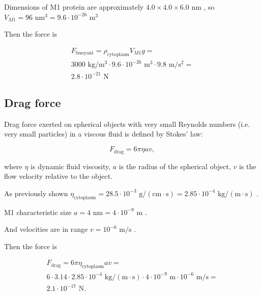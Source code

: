 Dimensions of M1 protein are approximately $4.0 \times 4.0 \times 6.0 \text{ nm}$ \cite{shtykova2013structural}, so $V_{M1} = 96 \text{ nm}^3 = 9.6 \cdot 10^{-26} \text{ m}^3$

Then the force is

\begin{equation}
\begin{split}
F_{\text{buoyant}} = \rho_{\text{cytoplasm}}V_{M1}g =\\
3000 \text{ kg}/\text{m}^3 \cdot 9.6 \cdot 10^{-26} \text{ m}^3 \cdot 9.8 \text{ m}/\text{s}^2 =\\
2.8 \cdot 10^{-21} \text{ N}
\end{split}
\end{equation}

\subsection{Drag force}

Drag force exerted on spherical objects with very small Reynolds numbers (i.e. very small particles) in a viscous fluid is defined by Stokes' law:

\begin{equation}
F_{\text{drag}} = 6\pi\eta av,
\end{equation}

where $\eta$ is dynamic fluid viscosity, $a$ is the radius of the spherical object, $v$ is the flow velocity relative to the object.

As previously shown $\eta_{\text{cytoplasm}} = 28.5 \cdot 10^{-3} \text{ g}/(\text{cm} \cdot \text{s}) = 2.85 \cdot 10^{-4} \text{ kg}/(\text{m} \cdot \text{s})$ \cite{swaminathan1997photobleaching, IAPWS2008}.

M1 characteristic size $a = 4 \text{ nm} = 4 \cdot 10^{-9} \text{ m}$ \cite{shtykova2013structural}.

And velocities are in range $v = 10^{-6} \text{ m/s}$ \cite{muller2008tug}.

Then the force is

\begin{equation}
\begin{split}
F_{\text{drag}} = 6\pi\eta_{\text{cytoplasm}} av = \\
6 \cdot 3.14 \cdot 2.85 \cdot 10^{-4} \text{ kg}/(\text{m} \cdot \text{s}) \cdot 4 \cdot 10^{-9} \text{ m} \cdot 10^{-6} \text{ m/s} =\\
2.1 \cdot 10^{-17} \text{ N}.
\end{split}
\end{equation}

